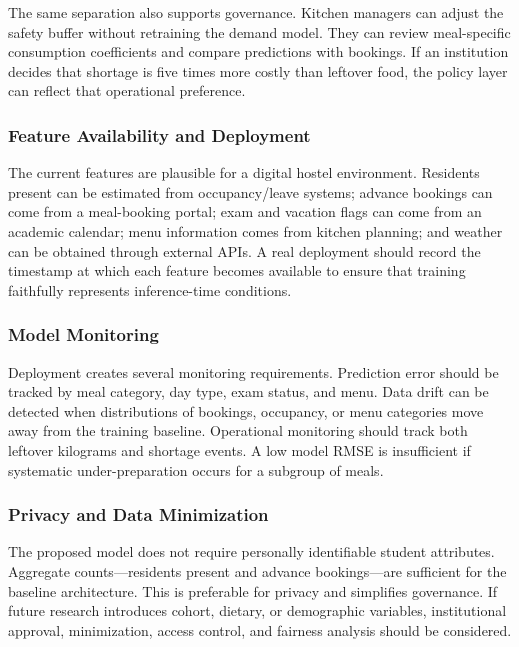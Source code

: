 \documentclass[conference]{IEEEtran}
\begin{document}
The same separation also supports governance. Kitchen managers can
adjust the safety buffer without retraining the demand model. They can
review meal-specific consumption coefficients and compare predictions
with bookings. If an institution decides that shortage is five times
more costly than leftover food, the policy layer can reflect that
operational preference.

\subsubsection{Feature Availability and
Deployment}\label{feature-availability-and-deployment}

The current features are plausible for a digital hostel environment.
Residents present can be estimated from occupancy/leave systems; advance
bookings can come from a meal-booking portal; exam and vacation flags
can come from an academic calendar; menu information comes from kitchen
planning; and weather can be obtained through external APIs. A real
deployment should record the timestamp at which each feature becomes
available to ensure that training faithfully represents inference-time
conditions.

\subsubsection{Model Monitoring}\label{model-monitoring}

Deployment creates several monitoring requirements. Prediction error
should be tracked by meal category, day type, exam status, and menu.
Data drift can be detected when distributions of bookings, occupancy, or
menu categories move away from the training baseline. Operational
monitoring should track both leftover kilograms and shortage events. A
low model RMSE is insufficient if systematic under-preparation occurs
for a subgroup of meals.

\subsubsection{Privacy and Data
Minimization}\label{privacy-and-data-minimization}

The proposed model does not require personally identifiable student
attributes. Aggregate counts---residents present and advance
bookings---are sufficient for the baseline architecture. This is
preferable for privacy and simplifies governance. If future research
introduces cohort, dietary, or demographic variables, institutional
approval, minimization, access control, and fairness analysis should be
considered.
\end{document}
